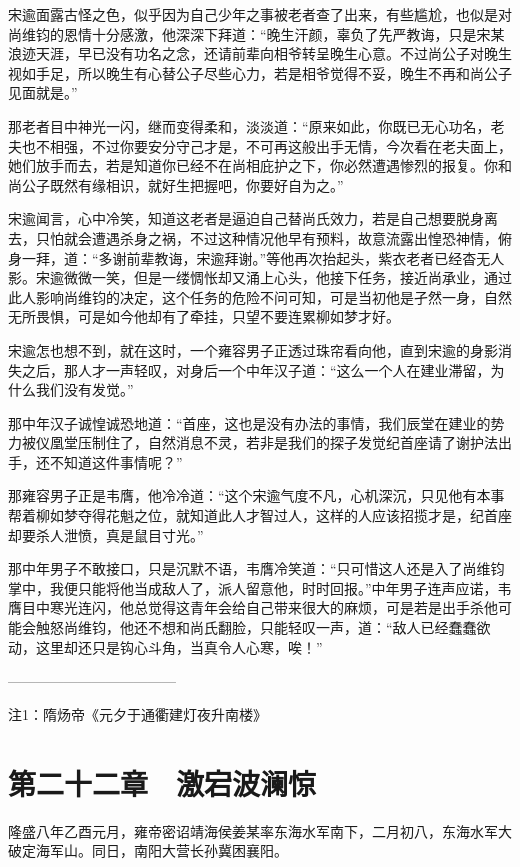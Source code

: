 宋逾面露古怪之色，似乎因为自己少年之事被老者查了出来，有些尴尬，也似是对尚维钧的恩情十分感激，他深深下拜道：“晚生汗颜，辜负了先严教诲，只是宋某浪迹天涯，早已没有功名之念，还请前辈向相爷转呈晚生心意。不过尚公子对晚生视如手足，所以晚生有心替公子尽些心力，若是相爷觉得不妥，晚生不再和尚公子见面就是。”

那老者目中神光一闪，继而变得柔和，淡淡道：“原来如此，你既已无心功名，老夫也不相强，不过你要安分守己才是，不可再这般出手无情，今次看在老夫面上，她们放手而去，若是知道你已经不在尚相庇护之下，你必然遭遇惨烈的报复。你和尚公子既然有缘相识，就好生把握吧，你要好自为之。”

宋逾闻言，心中冷笑，知道这老者是逼迫自己替尚氏效力，若是自己想要脱身离去，只怕就会遭遇杀身之祸，不过这种情况他早有预料，故意流露出惶恐神情，俯身一拜，道：“多谢前辈教诲，宋逾拜谢。”等他再次抬起头，紫衣老者已经杳无人影。宋逾微微一笑，但是一缕惆怅却又涌上心头，他接下任务，接近尚承业，通过此人影响尚维钧的决定，这个任务的危险不问可知，可是当初他是孑然一身，自然无所畏惧，可是如今他却有了牵挂，只望不要连累柳如梦才好。

宋逾怎也想不到，就在这时，一个雍容男子正透过珠帘看向他，直到宋逾的身影消失之后，那人才一声轻叹，对身后一个中年汉子道：“这么一个人在建业滞留，为什么我们没有发觉。”

那中年汉子诚惶诚恐地道：“首座，这也是没有办法的事情，我们辰堂在建业的势力被仪凰堂压制住了，自然消息不灵，若非是我们的探子发觉纪首座请了谢护法出手，还不知道这件事情呢？”

那雍容男子正是韦膺，他冷冷道：“这个宋逾气度不凡，心机深沉，只见他有本事帮着柳如梦夺得花魁之位，就知道此人才智过人，这样的人应该招揽才是，纪首座却要杀人泄愤，真是鼠目寸光。”

那中年男子不敢接口，只是沉默不语，韦膺冷笑道：“只可惜这人还是入了尚维钧掌中，我便只能将他当成敌人了，派人留意他，时时回报。”中年男子连声应诺，韦膺目中寒光连闪，他总觉得这青年会给自己带来很大的麻烦，可是若是出手杀他可能会触怒尚维钧，他还不想和尚氏翻脸，只能轻叹一声，道：“敌人已经蠢蠢欲动，这里却还只是钩心斗角，当真令人心寒，唉！”

————————————

注1：隋炀帝《元夕于通衢建灯夜升南楼》

\chapter{第二十二章　激宕波澜惊}

隆盛八年乙酉元月，雍帝密诏靖海侯姜某率东海水军南下，二月初八，东海水军大破定海军山。同日，南阳大营长孙冀困襄阳。

